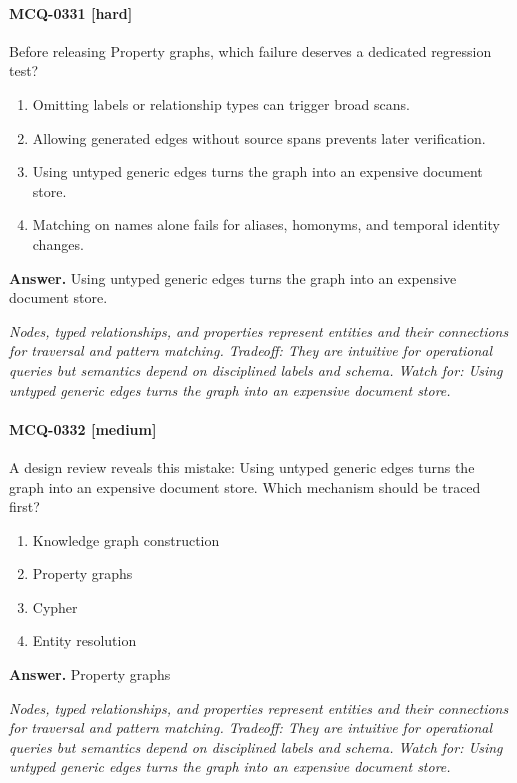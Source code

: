 \paragraph{MCQ-0331 [hard]} Before releasing Property graphs, which failure deserves a dedicated regression test?
\begin{enumerate}[label=\Alph*.]
\item Omitting labels or relationship types can trigger broad scans.
\item Allowing generated edges without source spans prevents later verification.
\item Using untyped generic edges turns the graph into an expensive document store.
\item Matching on names alone fails for aliases, homonyms, and temporal identity changes.
\end{enumerate}
\noindent\textbf{Answer.} Using untyped generic edges turns the graph into an expensive document store.
\par\textit{Nodes, typed relationships, and properties represent entities and their connections for traversal and pattern matching. Tradeoff: They are intuitive for operational queries but semantics depend on disciplined labels and schema. Watch for: Using untyped generic edges turns the graph into an expensive document store.}
\paragraph{MCQ-0332 [medium]} A design review reveals this mistake: Using untyped generic edges turns the graph into an expensive document store. Which mechanism should be traced first?
\begin{enumerate}[label=\Alph*.]
\item Knowledge graph construction
\item Property graphs
\item Cypher
\item Entity resolution
\end{enumerate}
\noindent\textbf{Answer.} Property graphs
\par\textit{Nodes, typed relationships, and properties represent entities and their connections for traversal and pattern matching. Tradeoff: They are intuitive for operational queries but semantics depend on disciplined labels and schema. Watch for: Using untyped generic edges turns the graph into an expensive document store.}
